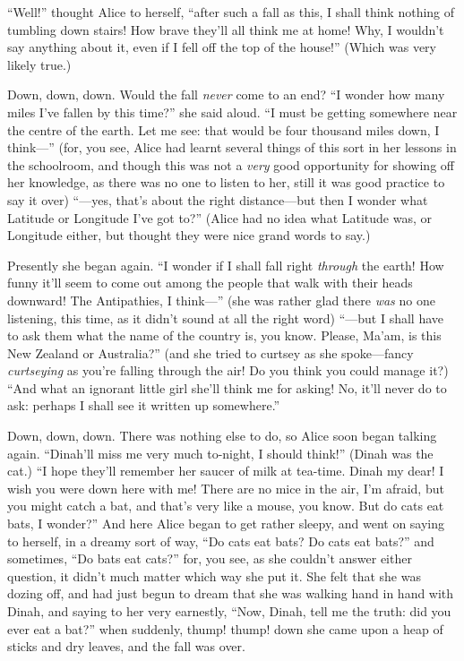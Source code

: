 \documentclass[11pt,openany,oneside]{book}
\begin{document}
“Well!” thought Alice to herself, “after such a fall as this, I shall think nothing of tumbling down stairs! How brave they’ll all think me at home! Why, I wouldn’t say anything about it, even if I fell off the top of the house!” (Which was very likely true.) 

Down, down, down. Would the fall {\em never\/} come to an end? “I wonder how many miles I’ve fallen by this time?” she said aloud. “I must be getting somewhere near the centre of the earth. Let me see: that would be four thousand miles down, I think—” (for, you see, Alice had learnt several things of this sort in her lessons in the schoolroom, and though this was not a {\em very\/} good opportunity for showing off her knowledge, as there was no one to listen to her, still it was good practice to say it over) “—yes, that’s about the right distance—but then I wonder what Latitude or Longitude I’ve got to?” (Alice had no idea what Latitude was, or Longitude either, but thought they were nice grand words to say.) 

Presently she began again. “I wonder if I shall fall right {\em through\/} the earth! How funny it’ll seem to come out among the people that walk with their heads downward! The Antipathies, I think—” (she was rather glad there {\em was\/} no one listening, this time, as it didn’t sound at all the right word) “—but I shall have to ask them what the name of the country is, you know. Please, Ma’am, is this New Zealand or Australia?” (and she tried to curtsey as she spoke—fancy {\em curtseying\/} as you’re falling through the air! Do you think you could manage it?) “And what an ignorant little girl she’ll think me for asking! No, it’ll never do to ask: perhaps I shall see it written up somewhere.” 

Down, down, down. There was nothing else to do, so Alice soon began talking again. “Dinah’ll miss me very much to-night, I should think!” (Dinah was the cat.) “I hope they’ll remember her saucer of milk at tea-time. Dinah my dear! I wish you were down here with me! There are no mice in the air, I’m afraid, but you might catch a bat, and that’s very like a mouse, you know. But do cats eat bats, I wonder?” And here Alice began to get rather sleepy, and went on saying to herself, in a dreamy sort of way, “Do cats eat bats? Do cats eat bats?” and sometimes, “Do bats eat cats?” for, you see, as she couldn’t answer either question, it didn’t much matter which way she put it. She felt that she was dozing off, and had just begun to dream that she was walking hand in hand with Dinah, and saying to her very earnestly, “Now, Dinah, tell me the truth: did you ever eat a bat?” when suddenly, thump! thump! down she came upon a heap of sticks and dry leaves, and the fall was over. 
\end{document}
